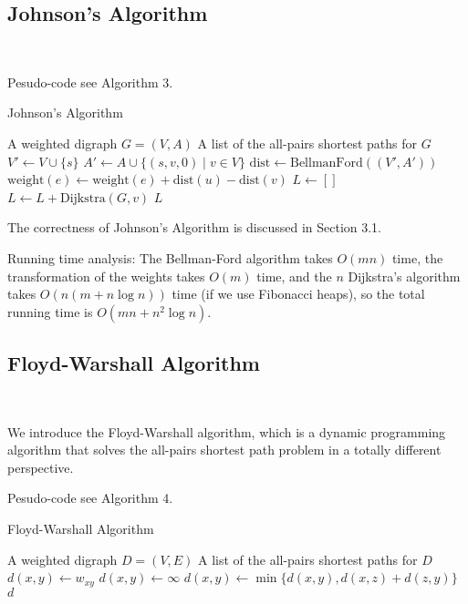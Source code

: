 \documentclass[11pt]{article}
\theoremstyle{plain}
\begin{document}
\subsection{Johnson's Algorithm}\

Pesudo-code see Algorithm 3.

\begin{algorithm}
  \caption{Johnson's Algorithm}
  \begin{algorithmic}[1]
  \REQUIRE A weighted digraph $G = (V, A)$
  \ENSURE A list of the all-pairs shortest paths for $G$
  \STATE $V' \leftarrow V \cup \{s\}$ 
  \STATE $A' \leftarrow A \cup \{(s, v, 0) \mid v \in V\}$
  \STATE $\text{dist} \leftarrow \text{BellmanFord}((V', A'))$ 
      \STATE $\text{weight}(e) \leftarrow \text{weight}(e) + \text{dist}(u) - \text{dist}(v)$
  \ENDFOR
  \STATE $L \leftarrow []$ 
      \STATE $L \leftarrow L + \text{Dijkstra}(G, v)$
  \ENDFOR
  \RETURN $L$
  \end{algorithmic}
\end{algorithm}

  The correctness of Johnson's Algorithm is discussed in Section 3.1. 

  Running time analysis: The Bellman-Ford algorithm takes $O(mn)$ time, the transformation of the weights takes $O(m)$ time,
  and the $n$ Dijkstra's algorithm takes $O(n(m + n \log n))$ time (if we use Fibonacci heaps), so the total running time is $O(mn + n^{2} \log n)$.

\subsection{Floyd-Warshall Algorithm}\

We introduce the Floyd-Warshall algorithm, which is a dynamic programming algorithm that solves the all-pairs shortest path problem
in a totally different perspective. 

Pesudo-code see Algorithm 4.

\begin{algorithm}
  \caption{Floyd-Warshall Algorithm}
  \begin{algorithmic}[1]
  \REQUIRE A weighted digraph $D = (V, E)$
  \ENSURE A list of the all-pairs shortest paths for $D$
          \STATE $d(x, y) \leftarrow w_{xy}$
      \ELSE
          \STATE $d(x, y) \leftarrow \infty$
      \ENDIF
  \ENDFOR
              \STATE $d(x, y) \leftarrow \min\{d(x, y), d(x, z) + d(z, y)\}$
          \ENDFOR
      \ENDFOR
  \ENDFOR
  \RETURN $d$
  \end{algorithmic}
\end{algorithm}
\end{document}
